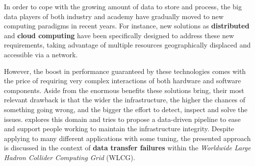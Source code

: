 In order to cope with the growing amount of data to store and process, the big data players of both industry and academy have gradually moved to new computing paradigms in recent years. 
For instance, new solutions as \textbf{distributed} and \textbf{cloud computing} \cite{kshemkalyani2011distributed, wang2010cloud} have been specifically designed to address these new requirements, taking advantage of multiple resources geographically displaced and accessible via a network.

However, the boost in performance guaranteed by these technologies comes with the price of requiring very complex interactions of both hardware and software components. 
Aside from the enormous benefits these solutions bring, their most relevant drawback is that the wider the infrastructure, the higher the chances of something going wrong, and the bigger the effort to detect, inspect and solve the issues.
 explores this domain and tries to propose a data-driven pipeline to ease and support people working to maintain the infrastructure integrity.
Despite applying to many different applications with some tuning, the presented approach is discussed in the context of \textbf{data transfer failures} within the \emph{Worldwide Large Hadron Collider Computing Grid} (WLCG).